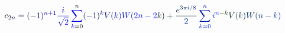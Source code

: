 \documentclass[12pt]{article}
\begin{document}
\makeatletter
\renewcommand*{\@textcolor}[3]{%
  \protect\leavevmode
  \begingroup
    \color#1{#2}#3%
  \endgroup
}
\makeatother
\begin{displaymath}
\mathcolor[RGB]{0,0,15}{c} _ { \mathcolor[RGB]{0,0,30}{2} \mathcolor[RGB]{0,0,45}{n} } \mathcolor[RGB]{0,0,60}{=} \mathcolor[RGB]{0,0,75}{(} \mathcolor[RGB]{0,0,90}{-} \mathcolor[RGB]{0,0,105}{1} \mathcolor[RGB]{0,0,120}{)} ^ { \mathcolor[RGB]{0,0,135}{n} \mathcolor[RGB]{0,0,150}{+} \mathcolor[RGB]{0,0,165}{1} } \mathcolor[RGB]{0,0,180}{\frac { \mathcolor[RGB]{0,0,195}{i} } { \mathcolor[RGB]{0,0,210}{\sqrt { \mathcolor[RGB]{0,0,225}{2} } } } } \mathcolor[RGB]{0,0,240}{\sum} _ { \mathcolor[RGB]{0,0,255}{k} \mathcolor[RGB]{0,15,0}{=} \mathcolor[RGB]{0,15,15}{0} } ^ { \mathcolor[RGB]{0,15,30}{n} } \mathcolor[RGB]{0,15,45}{(} \mathcolor[RGB]{0,15,60}{-} \mathcolor[RGB]{0,15,75}{1} \mathcolor[RGB]{0,15,90}{)} ^ { \mathcolor[RGB]{0,15,105}{k} } \mathcolor[RGB]{0,15,120}{V} \mathcolor[RGB]{0,15,135}{(} \mathcolor[RGB]{0,15,150}{k} \mathcolor[RGB]{0,15,165}{)} \mathcolor[RGB]{0,15,180}{W} \mathcolor[RGB]{0,15,195}{(} \mathcolor[RGB]{0,15,210}{2} \mathcolor[RGB]{0,15,225}{n} \mathcolor[RGB]{0,15,240}{-} \mathcolor[RGB]{0,15,255}{2} \mathcolor[RGB]{0,30,0}{k} \mathcolor[RGB]{0,30,15}{)} \mathcolor[RGB]{0,30,30}{+} \mathcolor[RGB]{0,30,45}{\frac { \mathcolor[RGB]{0,30,60}{e} ^ { \mathcolor[RGB]{0,30,75}{3} \mathcolor[RGB]{0,30,90}{\pi} \mathcolor[RGB]{0,30,105}{i} \mathcolor[RGB]{0,30,120}{/} \mathcolor[RGB]{0,30,135}{8} } } { \mathcolor[RGB]{0,30,150}{2} } } \mathcolor[RGB]{0,30,165}{\sum} _ { \mathcolor[RGB]{0,30,180}{k} \mathcolor[RGB]{0,30,195}{=} \mathcolor[RGB]{0,30,210}{0} } ^ { \mathcolor[RGB]{0,30,225}{n} } \mathcolor[RGB]{0,30,240}{i} ^ { \mathcolor[RGB]{0,30,255}{n} \mathcolor[RGB]{0,45,0}{-} \mathcolor[RGB]{0,45,15}{k} } \mathcolor[RGB]{0,45,30}{V} \mathcolor[RGB]{0,45,45}{(} \mathcolor[RGB]{0,45,60}{k} \mathcolor[RGB]{0,45,75}{)} \mathcolor[RGB]{0,45,90}{W} \mathcolor[RGB]{0,45,105}{(} \mathcolor[RGB]{0,45,120}{n} \mathcolor[RGB]{0,45,135}{-} \mathcolor[RGB]{0,45,150}{k} \mathcolor[RGB]{0,45,165}{)}
\end{displaymath}
\end{document}
